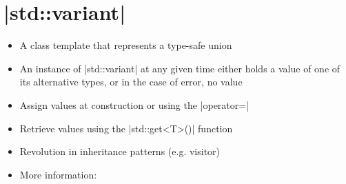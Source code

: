 \section{\CPP|std::variant|}
\begin{frame}[fragile]{\insertsectionhead}
    \vspace{-3mm}
    \begin{itemize}
        \item A class template that represents a type-safe union
        \item An instance of \CPP|std::variant| at any given time either holds a value of one of its alternative types, or in the case of error, no value 
        \item Assign values at construction or using the \CPP|operator=|
        \item Retrieve values using the \CPP|std::get<T>()| function
        \item \alert{Revolution in inheritance patterns (e.g. visitor)}
        \item More information: 
    \end{itemize}
\end{frame}
